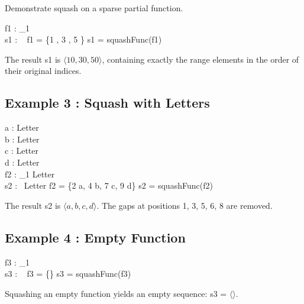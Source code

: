 \documentclass[a4paper,10pt,fleqn]{article}
\begin{document}
\noindent Demonstrate squash on a sparse partial function.

\bigskip

\begin{axdef}
f1 : \nat_1 \pfun \nat \\
s1 : \seq~\nat
\where
f1 = \{1 , 3 , 5 \} \land s1 = squashFunc(f1)
\end{axdef}

\noindent The result s1 is $\langle 10, 30, 50 \rangle$, containing exactly the range elements in the order of their original indices.

\bigskip

\subsection*{Example 3 : Squash with Letters}

\begin{zed}
[Letter]
\end{zed}

\begin{axdef}
a : Letter \\
b : Letter \\
c : Letter \\
d : Letter \\
f2 : \nat_1 \pfun Letter \\
s2 : \seq~Letter
\where
f2 = \{2 \mapsto a, 4 \mapsto b, 7 \mapsto c, 9 \mapsto d\} \land s2 = squashFunc(f2)
\end{axdef}

\noindent The result s2 is $\langle a, b, c, d \rangle$. The gaps at positions 1, 3, 5, 6, 8 are removed.

\bigskip

\subsection*{Example 4 : Empty Function}

\begin{axdef}
f3 : \nat_1 \pfun \nat \\
s3 : \seq~\nat
\where
f3 = \{\} \land s3 = squashFunc(f3)
\end{axdef}

\noindent Squashing an empty function yields an empty sequence: s3 = $\langle \rangle$.

\bigskip
\end{document}
